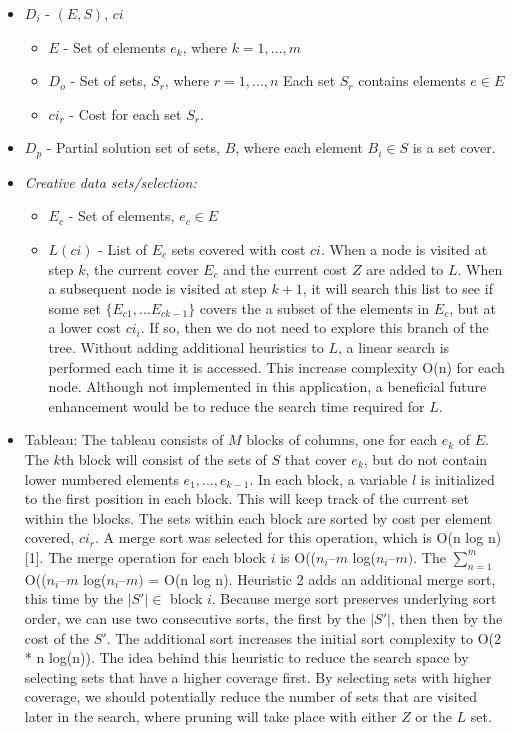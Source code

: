 \documentclass[12pt]{article}
\begin{document}
	\begin{itemize}
		\item $D_i$ - $(E, S)$, $ci$
		\begin{itemize}
			\item $E$ - Set of elements $e_k$, where $k = 1,...,m$
			\item $D_o$ - Set of sets, $S_r$, where $r = 1,...,n$ Each set $S_r$ contains elements $e \in E$
			\item $ci_r$ - Cost for each set $S_r$.
		\end{itemize}
		\item $D_p$ - Partial solution set of sets, $B$, where each element $B_i \in S$ is a set cover.
	\end{itemize}
	\begin{itemize}
		\item \textit{Creative data sets/selection:}
		\begin{itemize}
			\item $E_c$ - Set of elements, $e_c \in E$
			\item $L(ci)$ - List of $E_c$ sets covered with cost $ci$. When a node is visited at step $k$, the current cover $E_c$ and the current cost $Z$ are added to $L$. When a subsequent node is visited at step $k + 1$, it will search this list to see if some set $\{E_{c1}, ... E_{ck-1}\}$ covers the a subset of the elements in $E_c$, but at a lower cost $ci_i$. If so, then we do not need to explore this branch of the tree. Without adding additional heuristics to $L$, a linear search is performed each time it is accessed. This increase complexity O(n) for each node. Although not implemented in this application, a beneficial future enhancement would be to reduce the search time required for $L$.
		\end{itemize}
		\item Tableau: The tableau consists of $M$ blocks of columns, one for each $e_k$ of $E$. The $k$th block will consist of the sets of $S$ that cover $e_k$, but do not contain lower numbered elements $e_1,...,e_{k-1}$. In each block, a variable $l$ is initialized to the first position in each block. This will keep track of the current set within the blocks. The sets within each block are sorted by cost per element covered, $ci_r$. A merge sort was selected for this operation, which is O(n log n) [1]. The merge operation for each block $i$ is O(($n_i – m$ log($n_i – m)$. The $\sum_{n = 1}^m$ O(($n_i – m$ log($n_i – m)$ = O(n log n). Heuristic 2 adds an additional merge sort, this time by the $|S\prime| \in$ block $i$. Because merge sort preserves underlying sort order, we can use two consecutive sorts, the first by the $|S\prime|$, then then by the cost of the $S\prime$. The additional sort increases the initial sort complexity to O(2 * n log(n)). The idea behind this heuristic to reduce the search space by selecting sets that have a higher coverage first. By selecting sets with higher coverage, we should potentially reduce the number of sets that are visited later in the search, where pruning will take place with either $Z$ or the $L$ set.
	\end{itemize}
	
\end{document}
